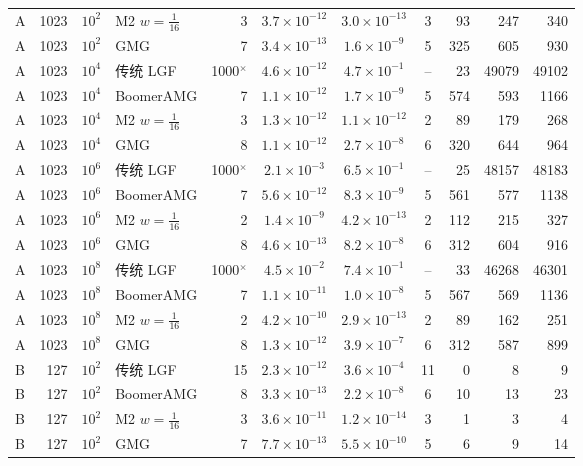 \begin{longtable}{lrrlrcccrrr}
A & 1023 & $10^{2}$ & M2 $w{=}\frac1{16}$ & 3 & $3.7{\times}10^{-12}$ & $3.0{\times}10^{-13}$ & 3 & 93 & 247 & 340 \\
A & 1023 & $10^{2}$ & GMG & 7 & $3.4{\times}10^{-13}$ & $1.6{\times}10^{-9}$ & 5 & 325 & 605 & 930 \\
A & 1023 & $10^{4}$ & 传统 LGF & 1000$^\times$ & $4.6{\times}10^{-12}$ & $4.7{\times}10^{-1}$ & -- & 23 & 49079 & 49102 \\
A & 1023 & $10^{4}$ & BoomerAMG & 7 & $1.1{\times}10^{-12}$ & $1.7{\times}10^{-9}$ & 5 & 574 & 593 & 1166 \\
A & 1023 & $10^{4}$ & M2 $w{=}\frac1{16}$ & 3 & $1.3{\times}10^{-12}$ & $1.1{\times}10^{-12}$ & 2 & 89 & 179 & 268 \\
A & 1023 & $10^{4}$ & GMG & 8 & $1.1{\times}10^{-12}$ & $2.7{\times}10^{-8}$ & 6 & 320 & 644 & 964 \\
A & 1023 & $10^{6}$ & 传统 LGF & 1000$^\times$ & $2.1{\times}10^{-3}$ & $6.5{\times}10^{-1}$ & -- & 25 & 48157 & 48183 \\
A & 1023 & $10^{6}$ & BoomerAMG & 7 & $5.6{\times}10^{-12}$ & $8.3{\times}10^{-9}$ & 5 & 561 & 577 & 1138 \\
A & 1023 & $10^{6}$ & M2 $w{=}\frac1{16}$ & 2 & $1.4{\times}10^{-9}$ & $4.2{\times}10^{-13}$ & 2 & 112 & 215 & 327 \\
A & 1023 & $10^{6}$ & GMG & 8 & $4.6{\times}10^{-13}$ & $8.2{\times}10^{-8}$ & 6 & 312 & 604 & 916 \\
A & 1023 & $10^{8}$ & 传统 LGF & 1000$^\times$ & $4.5{\times}10^{-2}$ & $7.4{\times}10^{-1}$ & -- & 33 & 46268 & 46301 \\
A & 1023 & $10^{8}$ & BoomerAMG & 7 & $1.1{\times}10^{-11}$ & $1.0{\times}10^{-8}$ & 5 & 567 & 569 & 1136 \\
A & 1023 & $10^{8}$ & M2 $w{=}\frac1{16}$ & 2 & $4.2{\times}10^{-10}$ & $2.9{\times}10^{-13}$ & 2 & 89 & 162 & 251 \\
A & 1023 & $10^{8}$ & GMG & 8 & $1.3{\times}10^{-12}$ & $3.9{\times}10^{-7}$ & 6 & 312 & 587 & 899 \\
B & 127 & $10^{2}$ & 传统 LGF & 15 & $2.3{\times}10^{-12}$ & $3.6{\times}10^{-4}$ & 11 & 0 & 8 & 9 \\
B & 127 & $10^{2}$ & BoomerAMG & 8 & $3.3{\times}10^{-13}$ & $2.2{\times}10^{-8}$ & 6 & 10 & 13 & 23 \\
B & 127 & $10^{2}$ & M2 $w{=}\frac1{16}$ & 3 & $3.6{\times}10^{-11}$ & $1.2{\times}10^{-14}$ & 3 & 1 & 3 & 4 \\
B & 127 & $10^{2}$ & GMG & 7 & $7.7{\times}10^{-13}$ & $5.5{\times}10^{-10}$ & 5 & 6 & 9 & 14 \\

\end{longtable}
